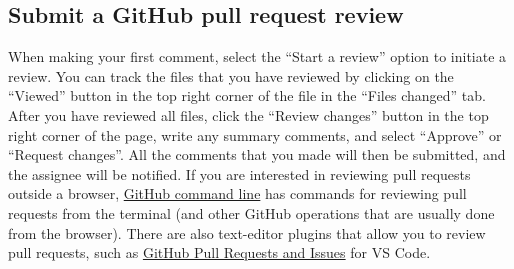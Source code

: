\subsection{Submit a GitHub pull request review}
When making your first comment, select the ``Start a review'' option to initiate a review.
You can track the files that you have reviewed by clicking on the ``Viewed'' button
in the top right corner of the file in the ``Files changed'' tab.
After you have reviewed all files,
click the ``Review changes'' button in the top right corner of the page,
write any summary comments, and select ``Approve'' or ``Request changes''.
All the comments that you made will then be submitted, and the assignee will be notified.
If you are interested in reviewing pull requests outside a browser,
\href{https://cli.github.com/}{GitHub command line} has commands for
reviewing pull requests from the terminal
(and other GitHub operations that are usually done from the browser).
There are also text-editor plugins that allow you to review pull requests,
such as \href{https://marketplace.visualstudio.com/items?itemName=GitHub.vscode-pull-request-github}{GitHub Pull Requests and Issues} for VS Code.
